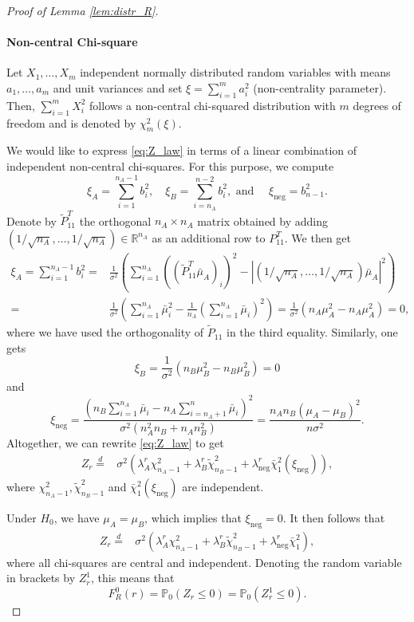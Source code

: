 \documentclass[11pt,a4paper]{article}
\renewcommand{\P}{\operatorname{P}}
\newcommand{\R}{\mathbb{R}}  %
\renewcommand{\P}{\mathbb{P}}  %
\newcommand{\eqdis}{\stackrel{d}{=}}
\begin{document}
\begin{proof}[Proof of Lemma \ref{lem:distr_R}]
	\paragraph{Non-central Chi-square}
	Let $X_1, \dots, X_m$ independent normally distributed random variables with means $a_1, \dots, a_m$ and unit variances and set $\xi = \sum_{i=1}^m a_i^2$ (non-centrality parameter). Then, $\sum_{i = 1}^m X_i^2$ follows a non-central chi-squared distribution with $m$ degrees of freedom and is denoted by $\chi^2_m(\xi)$.

	We would like to express \eqref{eq:Z_law} in terms of a linear combination of independent non-central chi-squares. For this purpose, we compute
	$$
		\xi_A = \sum_{i=1}^{n_A -1} b_i^2, \quad \xi_B = \sum_{i=n_A}^{n-2} b_i^2, \text{ and } \quad \xi_{\text{neg}} = b_{n-1}^2.
	$$
	Denote by $\tilde P_{11}^T$ the orthogonal $n_A \times n_A$ matrix obtained by adding $(1/\sqrt{n_A}, \dots, 1/\sqrt{n_A}) \in \R^{n_A}$  as an additional row to $P_{11}^T$. We then get
	\begin{align*}
		\xi_A  = \sum_{i=1}^{n_A -1} b_i^2 =
		  & \frac{1}{\sigma^2} \left(\sum_{i=1}^{n_A} \left(\left(\tilde P_{11}^T \bar \mu_A \right)_i \right)^2 - |(1/\sqrt{n_A}, \dots, 1/\sqrt{n_A}) \bar\mu_A|^2 \right) \\
		= & \frac{1}{\sigma^2} \left(\sum_{i=1}^{n_A} \bar \mu_i^2 - \frac{1}{n_A} \left(\sum_{i=1}^{n_A} \bar \mu_i \right)^2 \right)
		= \frac{1}{\sigma^2} \left(n_A \mu_A^2 - n_A \mu_A^2 \right) = 0,
	\end{align*}
	where we have used the orthogonality of $\tilde P_{11}$ in the third equality. Similarly, one gets
	$$
		\xi_B = \frac{1}{\sigma^2} \left(n_B \mu_B^2 - n_B \mu_B^2 \right) = 0
	$$
	and
	$$
		\xi_{\text{neg}} = \frac{\left(n_B \sum_{i=1}^{n_A} \bar \mu_i - n_A \sum_{i=n_A + 1}^n \bar \mu_i \right)^2}{\sigma^2\left(n_A^2 n_B + n_A n_B^2\right)} =
		\frac{n_A n_B (\mu_A - \mu_B)^2}{n\sigma^2}.
	$$
	Altogether, we can rewrite \eqref{eq:Z_law} to get
	\begin{align}\label{eq:Z_law2}
		Z_r \eqdis
		 & \sigma^2 \left(
		\lambda_{A}^r \chi^2_{n_A -1}
		+ \lambda_{B}^r \tilde \chi^2_{n_B -1}
		+ \lambda_{\text{neg}}^r \bar \chi_1^2(\xi_{\text{neg}})
		\right),
	\end{align}
	where $\chi^2_{n_A -1}, \tilde \chi^2_{n_B -1}$ and $\bar \chi_1^2(\xi_{\text{neg}})$ are independent.

	Under $H_0$, we have $\mu_A = \mu_B$, which implies that $\xi_{\text{neg}} = 0$. It then follows that
	\begin{align}\label{eq:Z_law3}
		Z_r \eqdis
		 & \sigma^2 \left(
		\lambda_{A}^r \chi^2_{n_A -1}
		+ \lambda_{B}^r \tilde \chi^2_{n_B -1}
		+ \lambda_{\text{neg}}^r \bar \chi_1^2
		\right),
	\end{align}
	where all chi-squares are central and independent. Denoting the random variable in brackets by $Z_r^1$, this means that
	$$
		F_R^0(r) = \P_0(Z_r \leq 0) = \P_0(Z_r^1 \leq 0).
	$$


\end{proof}
\end{document}

